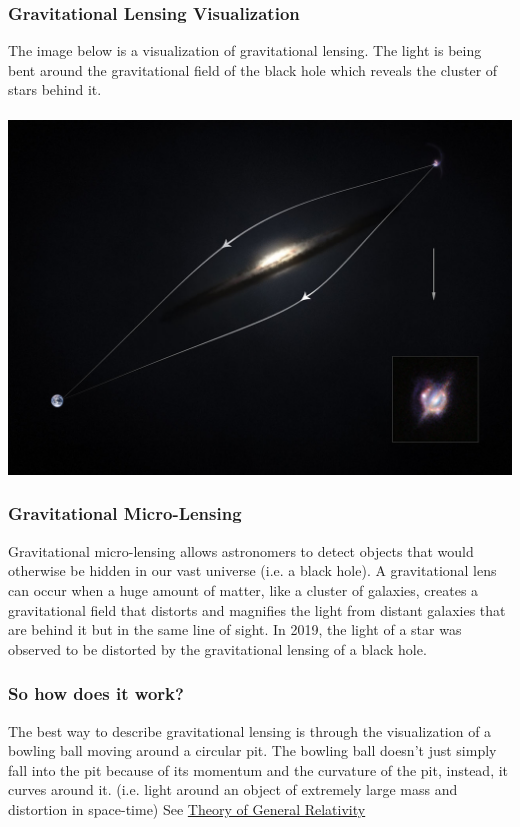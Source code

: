 \documentclass{article}
\begin{document}
\subsubsection{Gravitational Lensing Visualization}
The image below is a visualization of gravitational lensing. The light is being bent around the gravitational field of the black hole which reveals the cluster of stars behind it.\\\\
\includegraphics[scale=0.2]{images/grav_lensing.png}

\subsubsection{Gravitational Micro-Lensing}
Gravitational micro-lensing allows astronomers to detect objects that would otherwise be hidden in our vast universe (i.e. a black hole). A gravitational lens can occur when a huge amount of matter, like a cluster of galaxies, creates a gravitational field that distorts and magnifies the light from distant galaxies that are behind it but in the same line of sight. In 2019, the light of a star was observed to be distorted by the gravitational lensing of a black hole.

\subsubsection{So how does it work?}
The best way to describe gravitational lensing is through the visualization of a bowling ball moving around a circular pit. The bowling ball doesn't just simply fall into the pit because of its momentum and the curvature of the pit, instead, it curves around it. (i.e. light around an object of extremely large mass and distortion in space-time) See \hyperref[sec:generalrelativity]{Theory of General Relativity}
\end{document}
